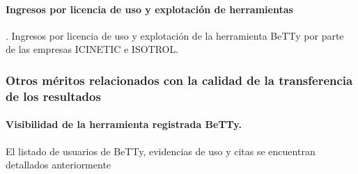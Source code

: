 \paragraph{Ingresos por licencia de uso y explotación de herramientas}. Ingresos por licencia de uso y explotación de la herramienta BeTTy  por parte de las empresas ICINETIC e ISOTROL.


%
\subsubsection{Otros méritos relacionados con la calidad de la transferencia de los resultados}


\paragraph{Visibilidad de la herramienta registrada BeTTy.} El listado de usuarios de BeTTy, evidencias de uso y citas se encuentran detallados anteriormente


